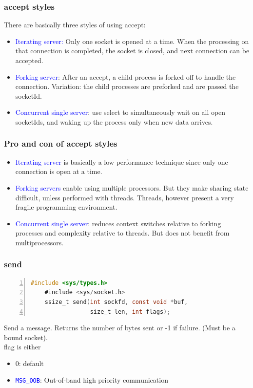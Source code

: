 \documentclass[12pt]{beamer}
\begin{document}
\begin{frame}
	\frametitle{accept styles}
	{\footnotesize
	There are basically three styles of using accept:
	\begin{itemize}
		\item \textcolor{blue}{Iterating server:} Only one socket is opened at a time. When the processing on that connection is completed, the socket is closed, and next connection can be accepted.
		\item \textcolor{blue}{Forking server}: After an accept, a child process is forked off to handle the connection. Variation: the child processes are preforked and are passed the socketId.
		\item \textcolor{blue}{Concurrent single server}: use select to simultaneously wait on all open socketIds, and waking up the process only when new data arrives.
	\end{itemize}
	}
\end{frame}

\begin{frame}
	\frametitle{Pro and con of accept styles}
	{\footnotesize

	\begin{itemize}
		\item \textcolor{blue}{Iterating server} is basically a low performance technique since
only one connection is open at a time.
		\item \textcolor{blue}{Forking servers} enable using multiple processors. But they
make sharing state difficult, unless performed with threads.
Threads, however present a very fragile programming
environment.
		\item \textcolor{blue}{Concurrent single server}: reduces context switches relative to
forking processes and complexity relative to threads. But does
not benefit from multiprocessors.
	\end{itemize}
	}
\end{frame}

\begin{frame}[fragile]
	\frametitle{send}
	{\tiny
	\begin{lstlisting}[language=C, breaklines=true, commentstyle=\color{mygreen},frame=lrtb,  rulecolor=\color{black}, numbers=left,  numbersep=5pt, numberstyle=\tiny\color{mygray}]
	#include <sys/types.h>
	#include <sys/socket.h>
	ssize_t send(int sockfd, const void *buf, 
	             size_t len, int flags);
	\end{lstlisting}}
	{\footnotesize
Send a message. Returns the number of bytes sent or -1 if failure. (Must be a bound socket). \\ flag is either
	\begin{itemize}
	\item 0: default
	\item \texttt{\textcolor{blue}{MSG\_OOB}}: Out-of-band high priority communication	
	\end{itemize}
	}
\end{frame}
\end{document}
